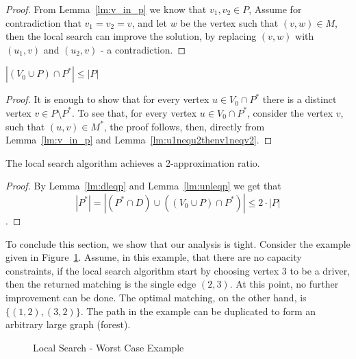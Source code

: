 \begin{proof}
From Lemma~\ref{lm:v_in_p} we know that $v_1, v_2 \in P$,
Assume for contradiction that $v_1 = v_2 = v$,
and let $w$ be the vertex such that $(v, w) \in M$,
then the local search can improve the solution, 
by replacing $(v, w)$ with $(u_1, v)$ and $(u_2, v)$ - a contradiction.
\end{proof}

\begin{lemma}
\label{lm:unleqp}
$|(V_0 \cup P) \cap P^*| \leq |P|$
\end{lemma}

\begin{proof}
It is enough to show that for every vertex $u \in V_0 \cap P^*$
there is a distinct vertex $v \in P \setminus P^*$.
To see that, for every vertex $u \in V_0 \cap P^*$, 
consider the vertex $v$, such that $(u, v) \in M^*$, 
the proof follows, then, directly
from Lemma~\ref{lm:v_in_p} and Lemma~\ref{lm:u1nequ2thenv1neqv2}.  
\end{proof}


\begin{theorem}
The local search algorithm achieves a 2-approximation ratio.
\end{theorem}

\begin{proof}
By Lemma~\ref{lm:dleqp} and Lemma~\ref{lm:unleqp} we get that 
$$
|P^*| = 
|(P^* \cap D) \cup ((V_0 \cup P) \cap P^*)| \leq 2 \cdot |P|
$$.
\end{proof}

To conclude this section, we show that our analysis is tight.
Consider the example given in Figure~\ref{fig:localtight}.
Assume, in this example, that there are no capacity constraints,
if the local search algorithm start by choosing vertex $3$ to be a driver, 
then the returned matching is the single edge $(2,3)$.
At this point, no further improvement can be done.
The optimal matching, on the other hand, is $\{(1, 2), (3, 2)\}$. 
The path in the example can be duplicated to form an arbitrary large graph (forest).

\begin{figure} 

\caption{
\label{fig:localtight}
Local Search - Worst Case Example
}
\end{figure}